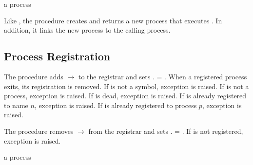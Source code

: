 \begin{procedure}
\end{procedure}
\returns{} a process

Like , the  procedure creates and
returns a new process that executes . In addition, it links
the new process to the calling process.

\subsection {Process Registration}

\begin{procedure}
\end{procedure}
\returns{} 

The  procedure adds  $\rightarrow$
 to the registrar and sets . =
. When a registered process exits, its registration is
removed. If  is not a symbol, exception  is raised. If  is not a process,
exception  is raised. If
 is dead, exception 
is raised. If  is already registered to name $n$,
exception  is raised. If
 is already registered to process $p$, exception
 is raised.

\begin{procedure}
\end{procedure}
\returns{} 

The  procedure removes  $\rightarrow$
 from the registrar and sets .
= .  If  is not registered, exception
 is raised.

\begin{procedure}
\end{procedure}
\returns{} a process \alt{} 

